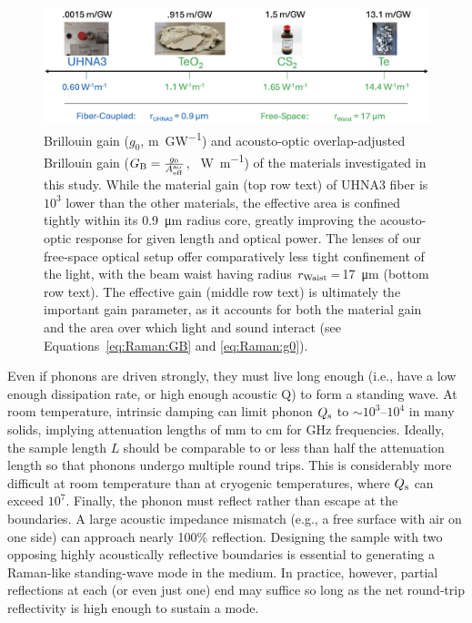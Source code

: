 \begin{figure}[t]
  \centering
  \includegraphics[width=\textwidth]{figs/4-Raman/GainofRelevantMaterials.png}
  \caption[Brillouin gain of investigated materials.]{Brillouin gain (\(g_{0}\), \si{\meter\per\giga\watt}) and acousto-optic overlap-adjusted Brillouin gain (\(G_{\rm B} = \frac{g_{0}}{A_{\rm eff}^{\rm ao}}\), \si{\per\watt\per\meter}) of the materials investigated in this study. While the material gain (top row text) of \ac{UHNA3} fiber is \(10^{3}\) lower than the other materials, the effective area is confined tightly within its \SI{0.9}{\micro\meter} radius core, greatly improving the acousto-optic response for given length and optical power. The lenses of our free-space optical setup offer comparatively less tight confinement of the light, with the beam waist having radius \(r_{\rm Waist}=\)\SI{17}{\micro\meter} (bottom row text). The effective gain (middle row text) is ultimately the important gain parameter, as it accounts for both the material gain and the area over which light and sound interact (see Equations~\ref{eq:Raman:GB} and \ref{eq:Raman:g0}). \cite{boyd2020nonlinear, dubinskii2004teo2, johnson2023laser, behunin2015long, enright1974depolarized, coakley1975brillouin, renninger2018bulk, uchida1969elastic, schweppe1970elastic, ohmachi1972acoustic, peercy1975temperature, fleury2018non, harris1991multichannel, uchida1971optical}}
  \label{fig:Raman:GainofRelevantMaterials}
\end{figure}

Even if phonons are driven strongly, they must live long enough (i.e., have a low enough dissipation rate, or high enough acoustic Q) to form a standing wave. At room temperature, intrinsic damping can limit phonon \(Q_{\rm s}\) to \(\sim10^{3}\)–\(10^{4}\) in many solids, \cite{heiman1979brillouin, bucaro1974high} implying attenuation lengths of \si{\milli\meter} to \si{\centi\meter} for \si{\giga\hertz} frequencies. Ideally, the sample length \(L\) should be comparable to or less than half the attenuation length so that phonons undergo multiple round trips. This is considerably more difficult at room temperature than at cryogenic temperatures, where \(Q_{\rm s}\) can exceed \(10^{7}\). \cite{maris1990phonon, renninger2018bulk} Finally, the phonon must reflect rather than escape at the boundaries. A large acoustic impedance mismatch (e.g., a free surface with air on one side) can approach nearly 100\% reflection. \cite{galliou2013extremely, auld1973acoustic} Designing the sample with two opposing highly acoustically reflective boundaries is essential to generating a Raman-like standing-wave mode in the medium. In practice, however, partial reflections at each (or even just one) end may suffice so long as the net round‐trip reflectivity is high enough to sustain a mode.

